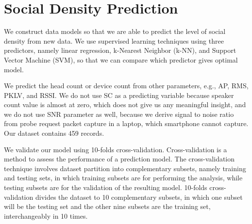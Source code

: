 


\section{Social Density Prediction} %
\label{sec:social-density-prediction}
We construct data models so that we are able to predict the level of social density from new data. We use supervised learning techniques using three predictors, namely linear regression, k-Nearest Neighbor (\ac{k-NN}), and Support Vector Machine (\ac{SVM}), so that we can compare which predictor gives optimal model.

We predict the head count or device count from other parameters, e.g., \ac{AP}, \ac{RMS}, \ac{PKLV}, and \ac{RSSI}. We do not use \ac{SC} as a predicting variable because speaker count value is almost at zero, which does not give us any meaningful insight, and we do not use \ac{SNR} parameter as well, because we derive signal to noise ratio from probe request packet capture in a laptop, which smartphone cannot capture. Our dataset contains 459 records.

We validate our model using 10-folds cross-validation. Cross-validation is a method to assess the performance of a prediction model. The cross-validation technique involves dataset partition into complementary subsets, namely training and testing sets, in which training subsets are for performing the analysis, while testing subsets are for the validation of the resulting model. 10-folds cross-validation divides the dataset to 10 complementary subsets, in which one subset will be the testing set and the other nine subsets are the training set, interchangeably in 10 times.

